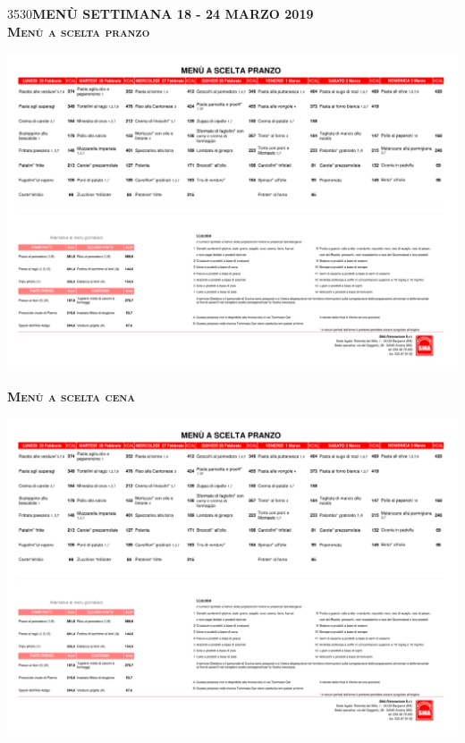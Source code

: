\documentclass{article}
\makeatletter
\newcommand\HUGE{\@setfontsize\Huge{35}{30}}
\newcommand{\frasequattro}{MENÙ SETTIMANA 18 - 24 MARZO 2019}
\makeatother
\begin{document}
\newpage
\begin{center}
{\HUGE \color{red}\textbf{\frasequattro}}\\
\vspace{0.7cm}
{\Huge \textbf{\textsc{Menù a scelta pranzo}}}\\
\end{center}
\includegraphics[trim=0cm 15.7cm 0cm 2.7cm,clip,page=7,width=\textwidth,]{scelta.pdf}
\vspace{0.3cm}
\begin{center}
{\Huge \textbf{\textsc{Menù a scelta cena}}}\\
\end{center}
\includegraphics[trim=0cm 17.3cm 0cm 2.2cm,clip,page=8,width=\textwidth,]{scelta.pdf}
\vspace{0.3cm}
\end{document}
